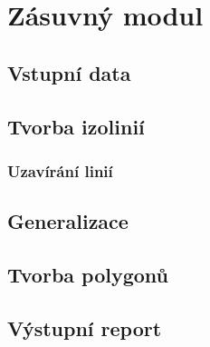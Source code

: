 \chapter{Zásuvný modul}
\label{4-plugin}

\section{Vstupní data}

\section{Tvorba izolinií}

\subsection{Uzavírání linií}

\section{Generalizace}

\section{Tvorba polygonů}

\section{Výstupní report}